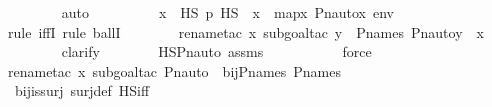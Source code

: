 \begin{isabellebody}
\ \ \ \ \ \ \isamarkupfalse%
\ auto\isanewline
\ \ \ \ \isamarkupfalse%
\ \isamarkupfalse%
\ {\isachardoublequoteopen}{\isachardot}{\kern0pt}{\isachardot}{\kern0pt}{\isachardot}{\kern0pt}\ {\isasymlongleftrightarrow}\ {\isacharparenleft}{\kern0pt}{\isasymforall}x\ {\isasymin}\ HS{\isachardot}{\kern0pt}\ {\isasympi}{\isacharbackquote}{\kern0pt}p\ {\isasymtturnstile}HS\ {\isasymphi}\ {\isacharbrackleft}{\kern0pt}x{\isacharbrackright}{\kern0pt}\ {\isacharat}{\kern0pt}\ map{\isacharparenleft}{\kern0pt}{\isasymlambda}x{\isachardot}{\kern0pt}\ Pn{\isacharunderscore}{\kern0pt}auto{\isacharparenleft}{\kern0pt}{\isasympi}{\isacharparenright}{\kern0pt}{\isacharbackquote}{\kern0pt}x{\isacharcomma}{\kern0pt}\ env{\isacharparenright}{\kern0pt}{\isacharparenright}{\kern0pt}{\isachardoublequoteclose}\isanewline
\ \ \ \ \ \ \isamarkupfalse%
{\isacharparenleft}{\kern0pt}rule\ iffI{\isacharcomma}{\kern0pt}\ rule\ ballI{\isacharparenright}{\kern0pt}\isanewline
\ \ \ \ \ \ \ \isamarkupfalse%
{\isacharparenleft}{\kern0pt}rename{\isacharunderscore}{\kern0pt}tac\ x{\isacharcomma}{\kern0pt}\ subgoal{\isacharunderscore}{\kern0pt}tac\ {\isachardoublequoteopen}{\isasymexists}y\ {\isasymin}\ P{\isacharunderscore}{\kern0pt}names{\isachardot}{\kern0pt}\ Pn{\isacharunderscore}{\kern0pt}auto{\isacharparenleft}{\kern0pt}{\isasympi}{\isacharparenright}{\kern0pt}{\isacharbackquote}{\kern0pt}y\ {\isacharequal}{\kern0pt}\ x{\isachardoublequoteclose}{\isacharparenright}{\kern0pt}\isanewline
\ \ \ \ \ \ \isamarkupfalse%
\ clarify\isanewline
\ \ \ \ \ \ \isamarkupfalse%
\ HS{\isacharunderscore}{\kern0pt}Pn{\isacharunderscore}{\kern0pt}auto\ assms\ \isanewline
\ \ \ \ \ \ \ \ \isamarkupfalse%
\ force\ \isanewline
\ \ \ \ \ \ \ \isamarkupfalse%
{\isacharparenleft}{\kern0pt}rename{\isacharunderscore}{\kern0pt}tac\ x{\isacharcomma}{\kern0pt}\ subgoal{\isacharunderscore}{\kern0pt}tac\ {\isachardoublequoteopen}Pn{\isacharunderscore}{\kern0pt}auto{\isacharparenleft}{\kern0pt}{\isasympi}{\isacharparenright}{\kern0pt}\ {\isasymin}\ bij{\isacharparenleft}{\kern0pt}P{\isacharunderscore}{\kern0pt}names{\isacharcomma}{\kern0pt}\ P{\isacharunderscore}{\kern0pt}names{\isacharparenright}{\kern0pt}{\isachardoublequoteclose}{\isacharparenright}{\kern0pt}\ \isanewline
\ \ \ \ \ \ \isamarkupfalse%
\ bij{\isacharunderscore}{\kern0pt}is{\isacharunderscore}{\kern0pt}surj\ surj{\isacharunderscore}{\kern0pt}def\ HS{\isacharunderscore}{\kern0pt}iff\ \isanewline

\end{isabellebody}
